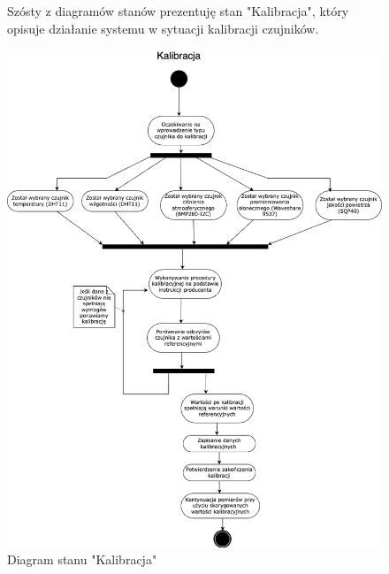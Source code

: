\documentclass{article}
\begin{document}
\begin{figure}
    \centering
    \begin{minipage}{0.6\textwidth}
        \centering
        \large Szósty z diagramów stanów prezentuję stan "Kalibracja", który opisuje działanie systemu w sytuacji kalibracji czujników.
    \end{minipage}
    \includegraphics[scale=0.5]{kalibracja.png}
    \caption{Diagram stanu "Kalibracja"}
    \label{etykieta8}
\end{figure}
\end{document}
